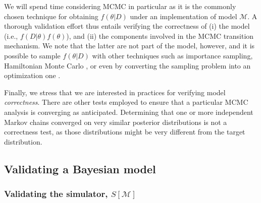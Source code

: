 \documentclass[oneside]{article}
\providecommand{\DIFaddtex}[1]{{\protect\color{blue}\uwave{#1}}} %
\providecommand{\DIFdeltex}[1]{{\protect\color{red}\sout{#1}}}                      %
\providecommand{\DIFaddbegin}{} %
\providecommand{\DIFaddend}{} %
\providecommand{\DIFdelbegin}{} %
\providecommand{\DIFdelend}{} %
\providecommand{\DIFadd}[1]{\texorpdfstring{\DIFaddtex{#1}}{#1}} %
\providecommand{\DIFdel}[1]{\texorpdfstring{\DIFdeltex{#1}}{}} %
\newcommand{\DIFscaledelfig}{0.5}
\newlength{\DIFdelgraphicswidth} %
\newlength{\DIFdelgraphicsheight} %
\newcommand{\DIFaddincludegraphics}[2][]{{\color{blue}\fbox{\DIFOincludegraphics[#1]{#2}}}} %
\newcommand{\DIFdelincludegraphics}[2][]{%
\sbox{\DIFdelgraphicsbox}{\DIFOincludegraphics[#1]{#2}}%
\settoboxwidth{\DIFdelgraphicswidth}{\DIFdelgraphicsbox} %
\settoboxtotalheight{\DIFdelgraphicsheight}{\DIFdelgraphicsbox} %
\scalebox{\DIFscaledelfig}{%
\parbox[b]{\DIFdelgraphicswidth}{\usebox{\DIFdelgraphicsbox}\\[-\baselineskip] \rule{\DIFdelgraphicswidth}{0em}}\llap{\resizebox{\DIFdelgraphicswidth}{\DIFdelgraphicsheight}{%
\setlength{\unitlength}{\DIFdelgraphicswidth}%
\begin{picture}(1,1)%
\thicklines\linethickness{2pt} %
{\color[rgb]{1,0,0}\put(0,0){\framebox(1,1){}}}%
{\color[rgb]{1,0,0}\put(0,0){\line( 1,1){1}}}%
{\color[rgb]{1,0,0}\put(0,1){\line(1,-1){1}}}%
\end{picture}%
}\hspace*{3pt}}} %
} %
\DeclareRobustCommand{\DIFaddbegin}{\DIFOaddbegin \let\includegraphics\DIFaddincludegraphics} %
\DeclareRobustCommand{\DIFaddend}{\DIFOaddend \let\includegraphics\DIFOincludegraphics} %
\DeclareRobustCommand{\DIFdelbegin}{\DIFOdelbegin \let\includegraphics\DIFdelincludegraphics} %
\DeclareRobustCommand{\DIFdelend}{\DIFOaddend \let\includegraphics\DIFOincludegraphics} %
\begin{document}
We will spend time considering MCMC in particular as it is the commonly
chosen technique for obtaining \DIFdelbegin \DIFdel{$f(\theta|D)$ }\DIFdelend \DIFaddbegin \DIFadd{$f(\theta|d)$ }\DIFaddend under an implementation of
model $\mathcal{M}$.
A thorough validation effort thus entails verifying the
correctness of (i) the model (i.e., \DIFdelbegin \DIFdel{$f(D|\theta)f(\theta)$}\DIFdelend \DIFaddbegin \DIFadd{$f(d|\theta)f(\theta)$}\DIFaddend ), and (ii)
the components involved in the MCMC transition mechanism.
We note that the latter are not part of the model, however, and it is 
possible to sample \DIFdelbegin \DIFdel{$f(\theta|D)$ }\DIFdelend \DIFaddbegin \DIFadd{$f(\theta|d)$ }\DIFaddend with other techniques such as importance
sampling, Hamiltonian Monte Carlo \citep{hmc}, or even by converting the
sampling problem into an optimization one \citep[e.g.,][]{zhang18}.

Finally, we stress that we are interested in practices for verifying model
\emph{correctness}.
There are other tests employed to ensure that a particular MCMC analysis
is converging as anticipated.
Determining that one or more independent Markov chains converged on very
similar posterior distributions is not a correctness test, as those
distributions might be very different from the target distribution.

\subsection*{Validating a Bayesian model}

\subsubsection*{Validating the simulator, \DIFdelbegin \DIFdel{$S[\mathcal{M}]$}\DIFdelend \DIFaddbegin \DIFadd{$\text{S}[\mathcal{M}]$}\DIFaddend }
\label{verify-correctness-of-simulator-implementation}
\end{document}
